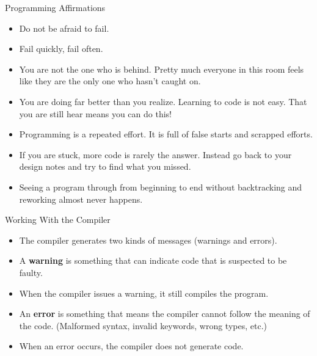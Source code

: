 \documentclass[]{beamer}
\begin{document}
\begin{frame}{Programming Affirmations}
  \begin{itemize}[<+->]
      \item Do not be afraid to fail.
      \item Fail quickly, fail often.
      \item You are not the one who is behind. Pretty much everyone
        in this room feels like they are the only one who hasn't caught
        on.
      \item You are doing far better than you realize. Learning to code
        is not easy.  That you are still hear means you can do this!
      \item Programming is a repeated effort. It is full of false starts
        and scrapped efforts.
      \item If you are stuck, more code is rarely the answer.  Instead
        go back to your design notes and try to find what you missed.
      \item Seeing a program through from beginning to end without 
        backtracking and reworking almost never happens.
  \end{itemize}
\end{frame}

\begin{frame}{Working With the Compiler}
    \begin{itemize}[<+>]
        \item The compiler generates two kinds of messages (warnings and errors).
        \item A \textbf{warning} is something that can indicate code that is suspected 
          to be faulty.
        \item When the compiler issues a warning, it still compiles the program.
        \item An \textbf{error} is something that means the compiler cannot
          follow the meaning of the code.  (Malformed syntax, invalid keywords, wrong types, etc.)
        \item When an error occurs, the compiler does not generate code.
    \end{itemize}
\end{frame}
\end{document}
